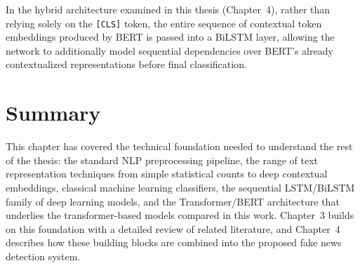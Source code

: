 In the hybrid architecture examined in this thesis (Chapter~4), rather than relying solely on the \texttt{[CLS]} token, the entire sequence of contextual token embeddings produced by BERT is passed into a BiLSTM layer, allowing the network to additionally model sequential dependencies over BERT's already contextualized representations before final classification.

\section{Summary}

This chapter has covered the technical foundation needed to understand the rest of the thesis: the standard NLP preprocessing pipeline, the range of text representation techniques from simple statistical counts to deep contextual embeddings, classical machine learning classifiers, the sequential LSTM/BiLSTM family of deep learning models, and the Transformer/BERT architecture that underlies the transformer-based models compared in this work. Chapter~3 builds on this foundation with a detailed review of related literature, and Chapter~4 describes how these building blocks are combined into the proposed fake news detection system.
